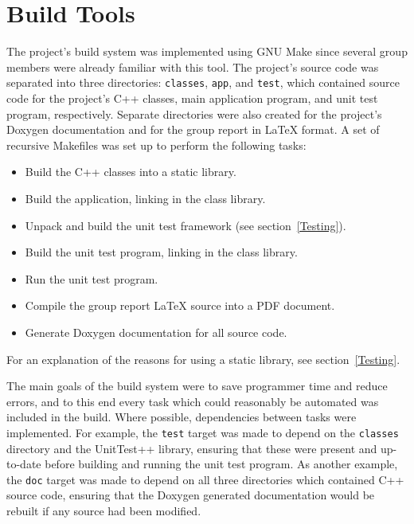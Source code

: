 \section{Build Tools}
\label{Build Tools}
The project's build system was implemented using GNU Make since several group members were already familiar with this tool.  The project's source code was separated into three directories: \texttt{classes}, \texttt{app}, and \texttt{test}, which contained source code for the project's C++ classes, main application program, and unit test program, respectively.  Separate directories were also created for the project's Doxygen documentation and for the group report in LaTeX format.  A set of recursive Makefiles was set up to perform the following tasks:

\begin{itemize}

  \item Build the C++ classes into a static library.
  \item Build the application, linking in the class library.
  \item Unpack and build the unit test framework (see section~\ref{Testing}).
  \item Build the unit test program, linking in the class library.
  \item Run the unit test program.
  \item Compile the group report LaTeX source into a PDF document.
  \item Generate Doxygen documentation for all source code.

\end{itemize}

For an explanation of the reasons for using a static library, see section~\ref{Testing}.  

The main goals of the build system were to save programmer time and reduce errors, and to this end every task which could reasonably be automated was included in the build.  Where possible, dependencies between tasks were implemented.  For example, the \texttt{test} target was made to depend on the \texttt{classes} directory and the UnitTest++ library, ensuring that these were present and up-to-date before building and running the unit test program.  As another example, the \texttt{doc} target was made to depend on all three directories which contained C++ source code, ensuring that the Doxygen generated documentation would be rebuilt if any source had been modified.

